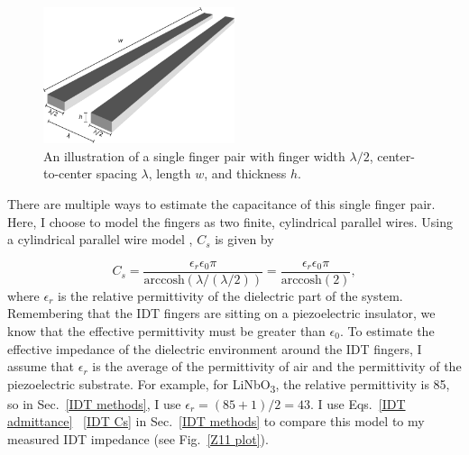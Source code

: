 \documentclass[double,12pt,1in,seploa]{beavtex}
\begin{document}
\begin{figure}
    \includegraphics[width = 0.5\textwidth]{IDT capacitance toy model_3d.pdf}
    \caption{An illustration of a single finger pair with finger width $\lambda/2$, center-to-center spacing $\lambda$, length $w$, and thickness $h$.}
    \label{IDT capacitance toy model}
\end{figure}
There are multiple ways to estimate the capacitance of this single finger pair. Here, I choose to model the fingers as two finite, cylindrical parallel wires. Using a cylindrical parallel wire model \cite[p.\ 682]{lonngren_fundamentals_2007}, $C_s$ is given by 

\begin{equation}
    C_s = \frac{\epsilon_r \epsilon_0 \pi}{\mathrm{arccosh}(\lambda/(\lambda/2))} = \frac{\epsilon_r \epsilon_0 \pi}{\mathrm{arccosh}(2)},
    \label{IDT Cs}
\end{equation}
where $\epsilon_r$ is the relative permittivity of the dielectric part of the system. Remembering that the IDT fingers are sitting on a piezoelectric insulator, we know that the effective permittivity must be greater than $\epsilon_0$. To estimate the effective impedance of the dielectric environment around the IDT fingers, I assume that $\epsilon_r$ is the average of the permittivity of air and the permittivity of the piezoelectric substrate. For example, for LiNbO\textsubscript{3}, the relative permittivity is 85, so in Sec.\ \ref{IDT methods}, I use $\epsilon_r = (85 + 1)/2 = 43$. I use Eqs.\ \ref{IDT admittance} \textendash\ \ref{IDT Cs} in Sec.\ \ref{IDT methods} to compare this model to my measured IDT impedance (see Fig.\ \ref{Z11 plot}).
\end{document}
